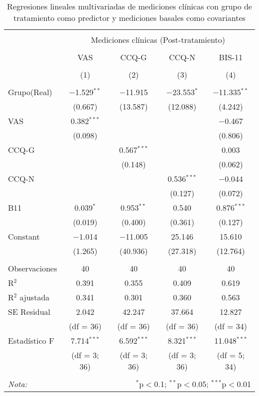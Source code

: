 \begin{table}[!ht] \centering
  \small
  \caption{Regresiones lineales multivariadas de mediciones clínicas con grupo de tratamiento como predictor y mediciones basales como covariantes}
  \label{tab:lmCl1}
\begin{tabular}{@{\extracolsep{5pt}}lcccc}
\\[-1.8ex]\hline
\hline \\[-1.8ex]
 & \multicolumn{4}{c}{Mediciones clínicas (Post-tratamiento)} \\
\cline{2-5}
\\[-1.8ex] & VAS & CCQ-G & CCQ-N & BIS-11 \\
\\[-1.8ex] & (1) & (2) & (3) & (4)\\
\hline \\[-1.8ex]
 Grupo(Real) & $-$1.529$^{**}$ & $-$11.915 & $-$23.553$^{*}$ & $-$11.335$^{**}$ \\
  & (0.667) & (13.587) & (12.088) & (4.242) \\
  VAS & 0.382$^{***}$ &  &  & $-$0.467 \\
  & (0.098) &  &  & (0.806) \\
  CCQ-G &  & 0.567$^{***}$ &  & 0.003 \\
  &  & (0.148) &  & (0.062) \\
  CCQ-N &  &  & 0.536$^{***}$ & $-$0.044 \\
  &  &  & (0.127) & (0.072) \\
  B11 & 0.039$^{*}$ & 0.953$^{**}$ & 0.540 & 0.876$^{***}$ \\
  & (0.019) & (0.400) & (0.361) & (0.127) \\
  Constant & $-$1.014 & $-$11.005 & 25.146 & 15.610 \\
  & (1.265) & (40.936) & (27.318) & (12.764) \\
 \hline \\[-1.8ex]
Observaciones & 40 & 40 & 40 & 40 \\
R$^{2}$ & 0.391 & 0.355 & 0.409 & 0.619 \\
R$^{2}$ ajustada & 0.341 & 0.301 & 0.360 & 0.563 \\
SE Residual & 2.042  & 42.247  & 37.664  & 12.827  \\
            & (df = 36) &(df = 36)&(df = 36)&(df = 34) \\
Estadístico F & 7.714$^{***}$  & 6.592$^{***}$  & 8.321$^{***}$  & 11.048$^{***}$  \\
              &(df = 3; 36)&(df = 3; 36)&(df = 3; 36)&(df = 5; 34)\\
\hline
\hline \\[-1.8ex]
\textit{Nota:}  & \multicolumn{4}{r}{$^{*}$p$<$0.1; $^{**}$p$<$0.05; $^{***}$p$<$0.01} \\
\end{tabular}
\end{table}

